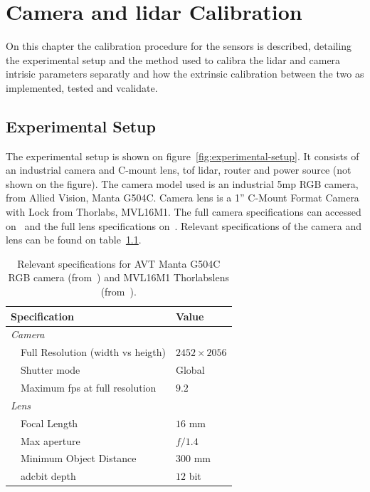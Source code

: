 
\chapter{Camera and \acs{lidar} Calibration}
\label{chapter:calibration}

On this chapter the calibration procedure for the sensors is described, detailing the experimental setup and the method used to calibra the \ac{lidar} and camera intrisic parameters separatly and how the extrinsic calibration between the two as implemented, tested and vcalidate. 

\section{Experimental Setup}
The experimental setup is shown on figure~\ref{fig:experimental-setup}. It consists of an industrial camera and C-mount lens, \ac{tof} \ac{lidar}, router and power source (not shown on the figure). The camera model used is an industrial 5\ac{mp} RGB camera, from Allied Vision, Manta G504C. Camera lens is a 1'' C-Mount Format Camera with Lock from Thorlabs\cp, MVL16M1. The full camera specifications can accessed on~\cite{MantaG504C} and the full lens specifications on~\cite{Thorlabs}. Relevant specifications of the camera and lens can be found on table~\ref{tab:camera-and-lens-specs}. 

\begin{table}[H]
	\renewcommand{\arraystretch}{1.2}
	\centering
	\begin{tabular}{@{}lp{7cm}l@{}}
		\toprule
		\multicolumn{2}{l}{Specification} & Value \\ \midrule
		\multicolumn{2}{l}{\emph{Camera}} & \\
		\phantom{a} & Full Resolution (width vs heigth) & $2452 \times 2056$   \\
									& Shutter mode & Global \\
									&	Maximum \ac{fps} at full resolution & $9.2$ \\ \midrule 
									\multicolumn{2}{l}{\emph{Lens}} \\
									&	Focal Length & $16$ mm \\
									&	Max aperture & $f/1.4$ \\
									&	Minimum Object Distance & $300$ mm  \\
									& \acs{adc}\footnotemark bit depth & $12$ bit \\
		\bottomrule
	\end{tabular}
	\caption{Relevant specifications for AVT Manta G504C RGB camera (from~\cite{MantaG504C})  and MVL16M1 Thorlabs\cp lens (from~\cite{Thorlabs}).}
	\label{tab:camera-and-lens-specs}
\end{table}

